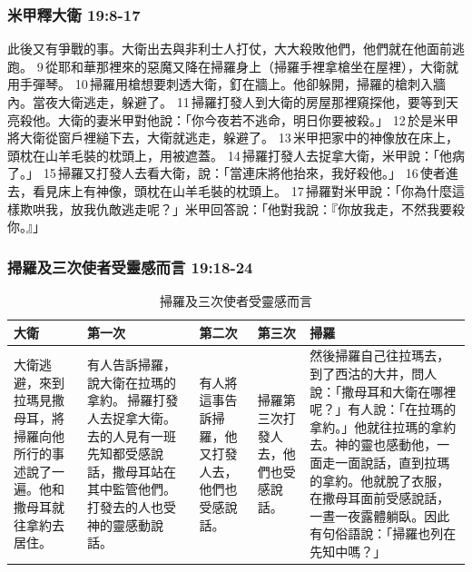 \subsubsection{米甲釋大衛 19:8-17}
此後又有爭戰的事。大衛出去與非利士人打仗，大大殺敗他們，他們就在他面前逃跑。 9 從耶和華那裡來的惡魔又降在掃羅身上（掃羅手裡拿槍坐在屋裡），大衛就用手彈琴。 10 掃羅用槍想要刺透大衛，釘在牆上。他卻躲開，掃羅的槍刺入牆內。當夜大衛逃走，躲避了。 11 掃羅打發人到大衛的房屋那裡窺探他，要等到天亮殺他。大衛的妻米甲對他說：「你今夜若不逃命，明日你要被殺。」 12 於是米甲將大衛從窗戶裡縋下去，大衛就逃走，躲避了。 13 米甲把家中的神像放在床上，頭枕在山羊毛裝的枕頭上，用被遮蓋。 14 掃羅打發人去捉拿大衛，米甲說：「他病了。」 15 掃羅又打發人去看大衛，說：「當連床將他抬來，我好殺他。」 16 使者進去，看見床上有神像，頭枕在山羊毛裝的枕頭上。 17 掃羅對米甲說：「你為什麼這樣欺哄我，放我仇敵逃走呢？」米甲回答說：「他對我說：『你放我走，不然我要殺你。』」

\subsubsection{掃羅及三次使者受靈感而言 19:18-24}
\begin{table}[H]
\centering 
\begin{tabular}{p{2.2cm}|p{3.75cm}|p{1.5cm}|p{1.2cm}|p{}}\hline\hline
大衛&第一次&第二次&第三次&掃羅\\\hline
大衛逃避，來到拉瑪見撒母耳，將掃羅向他所行的事述說了一遍。他和撒母耳就往拿約去居住。&有人告訴掃羅，說大衛在拉瑪的拿約。 掃羅打發人去捉拿大衛。去的人見有一班先知都受感說話，撒母耳站在其中監管他們。打發去的人也受神的靈感動說話。&有人將這事告訴掃羅，他又打發人去，他們也受感說話。&掃羅第三次打發人去，他們也受感說話。&然後掃羅自己往拉瑪去，到了西沽的大井，問人說：「撒母耳和大衛在哪裡呢？」有人說：「在拉瑪的拿約。」他就往拉瑪的拿約去。神的靈也感動他，一面走一面說話，直到拉瑪的拿約。他就脫了衣服，在撒母耳面前受感說話，一晝一夜露體躺臥。因此有句俗語說：「掃羅也列在先知中嗎？」\\\hline
\end{tabular}
\caption{掃羅及三次使者受靈感而言}
\end{table}
 
